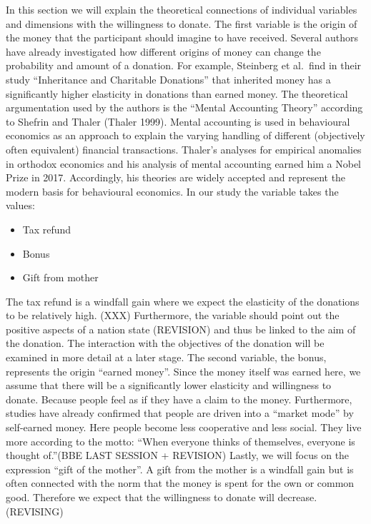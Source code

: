 \documentclass[
  12pt,
]{article}
\providecommand{\tightlist}{%
  \setlength{\itemsep}{0pt}\setlength{\parskip}{0pt}}
\begin{document}
In this section we will explain the theoretical connections of
individual variables and dimensions with the willingness to donate. The
first variable is the origin of the money that the participant should
imagine to have received. Several authors have already investigated how
different origins of money can change the probability and amount of a
donation. For example, Steinberg et al.~find in their study
``Inheritance and Charitable Donations'' that inherited money has a
significantly higher elasticity in donations than earned money. The
theoretical argumentation used by the authors is the ``Mental Accounting
Theory'' according to Shefrin and Thaler (Thaler 1999). Mental
accounting is used in behavioural economics as an approach to explain
the varying handling of different (objectively often equivalent)
financial transactions. Thaler's analyses for empirical anomalies in
orthodox economics and his analysis of mental accounting earned him a
Nobel Prize in 2017. Accordingly, his theories are widely accepted and
represent the modern basis for behavioural economics. In our study the
variable takes the values:

\begin{itemize}
\tightlist
\item
  Tax refund
\item
  Bonus
\item
  Gift from mother
\end{itemize}

The tax refund is a windfall gain where we expect the elasticity of the
donations to be relatively high. (XXX) Furthermore, the variable should
point out the positive aspects of a nation state (REVISION) and thus be
linked to the aim of the donation. The interaction with the objectives
of the donation will be examined in more detail at a later stage. The
second variable, the bonus, represents the origin ``earned money''.
Since the money itself was earned here, we assume that there will be a
significantly lower elasticity and willingness to donate. Because people
feel as if they have a claim to the money. Furthermore, studies have
already confirmed that people are driven into a ``market mode'' by
self-earned money. Here people become less cooperative and less social.
They live more according to the motto: ``When everyone thinks of
themselves, everyone is thought of.''(BBE LAST SESSION + REVISION)
Lastly, we will focus on the expression ``gift of the mother''. A gift
from the mother is a windfall gain but is often connected with the norm
that the money is spent for the own or common good. Therefore we expect
that the willingness to donate will decrease. (REVISING)
\end{document}
